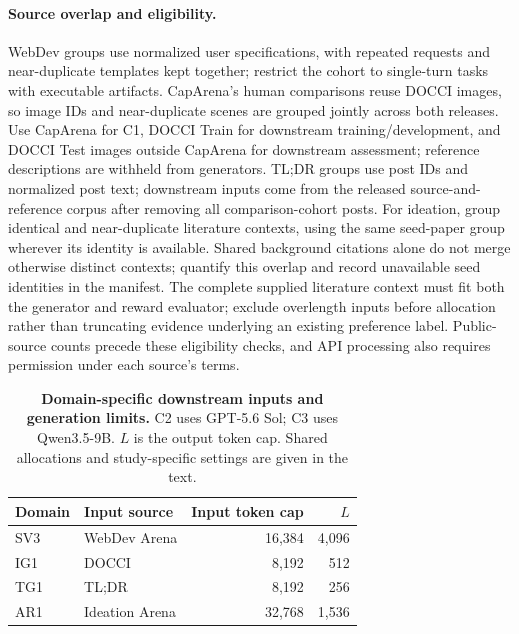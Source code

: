 \paragraph{Source overlap and eligibility.}
WebDev groups use normalized user specifications, with repeated requests and near-duplicate templates kept together; restrict the cohort to single-turn tasks with executable artifacts.
CapArena's human comparisons reuse DOCCI images, so image IDs and near-duplicate scenes are grouped jointly across both releases.
Use CapArena for C1, DOCCI Train for downstream training/development, and DOCCI Test images outside CapArena for downstream assessment; reference descriptions are withheld from generators.
TL;DR groups use post IDs and normalized post text; downstream inputs come from the released source-and-reference corpus after removing all comparison-cohort posts.
For ideation, group identical and near-duplicate literature contexts, using the same seed-paper group wherever its identity is available.
Shared background citations alone do not merge otherwise distinct contexts; quantify this overlap and record unavailable seed identities in the manifest.
The complete supplied literature context must fit both the generator and reward evaluator; exclude overlength inputs before allocation rather than truncating evidence underlying an existing preference label.
Public-source counts precede these eligibility checks, and API processing also requires permission under each source's terms.

\begin{table}[!htbp]
\caption{\textbf{Domain-specific downstream inputs and generation limits.}
C2 uses GPT-5.6 Sol; C3 uses Qwen3.5-9B. $L$ is the output token cap. Shared allocations and study-specific settings are given in the text.}
\label{tab:downstream-config}
\centering\small
\begin{tabularx}{\linewidth}{@{}lYrr@{}}
\toprule
Domain & Input source & Input token cap & $L$\\
\midrule
SV3 & WebDev Arena & 16,384 & 4,096\\
IG1 & DOCCI & 8,192 & 512\\
TG1 & TL;DR & 8,192 & 256\\
AR1 & Ideation Arena & 32,768 & 1,536\\
\bottomrule
\end{tabularx}
\end{table}

